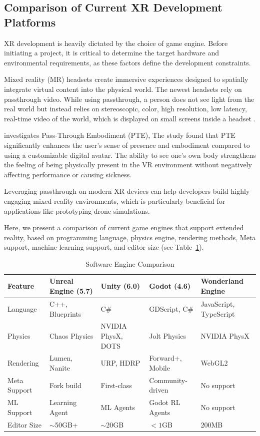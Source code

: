 \subsection{Comparison of Current XR Development Platforms}

XR development is heavily dictated by the choice of game engine. Before initiating a project, it is critical to determine the target hardware and environmental requirements, as these factors define the development constraints.


Mixed reality (MR) headsets create immersive experiences designed to spatially integrate virtual content into the physical world. The newest headsets rely on passthrough video. While using passthrough, a person does not see light from the real world but instead relies on stereoscopic, color, high resolution, low latency, real-time video of the world, which is displayed on small screens inside a headset \parencite{bailenson2024passthrough}.

\parencite{waldow_investigating_2025} investigates Pass-Through Embodiment (PTE), The study found that PTE significantly enhances the user's sense of presence and embodiment compared to using a customizable digital avatar. The ability to see one's own body strengthens the feeling of being physically present in the VR environment without negatively affecting performance or causing sickness.

Leveraging passthrough on modern XR devices can help developers build highly engaging mixed-reality environments, which is particularly beneficial for applications like prototyping drone simulations.

Here, we present a comparison of current game engines that support extended reality, based on programming language, physics engine, rendering methods, Meta support, machine learning support, and editor size (see Table~\ref{table:xr_engine}).

\begin{table}[h]
\centering
\caption{Software Engine Comparison}\label{table:xr_engine}
\setlength{\tabcolsep}{6pt} 
\begin{tabularx}{1\textwidth}{l|X|X|X|X}
\hline
Feature & Unreal Engine (5.7) & Unity (6.0) & Godot (4.6) & Wonderland Engine \\
\hline
Language & C++, Blueprints    & C\#        & GDScript, C\# & JavaScript, TypeScript \\
Physics & Chaos Physics      & NVIDIA PhysX, DOTS & Jolt Physics   & NVIDIA PhysX \\
Rendering  & Lumen, Nanite & URP, HDRP    & Forward+, Mobile & WebGL2 \\
Meta Support & Fork build  & First-class & Community-driven & No support \\
ML Support & Learning Agent & ML Agents & Godot RL Agents & No support \\
Editor Size & $\sim$50GB+ & $\sim$20GB & $<1$GB & 200MB \\
\hline
\end{tabularx}

\end{table}

